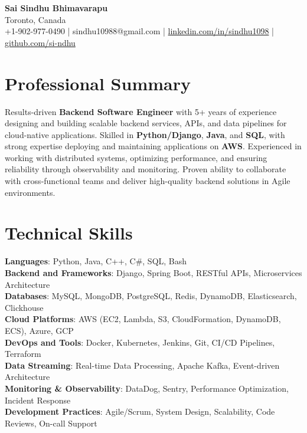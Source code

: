 \documentclass[letterpaper,11pt]{article}
\begin{document}
\begin{center}
  {\Large \textbf{Sai Sindhu Bhimavarapu}} \\
  Toronto, Canada \\
  +1-902-977-0490 \enspace | \enspace sindhu10988@gmail.com \enspace | \enspace \href{https://www.linkedin.com/in/sindhu1098/}{linkedin.com/in/sindhu1098} \enspace | \enspace \href{https://github.com/si-ndhu}{github.com/si-ndhu}
\end{center}

\section{Professional Summary}
  \begin{itemize}[leftmargin=0.15in, label={}]
    \small{\item{
     Results-driven \textbf{Backend Software Engineer} with 5+ years of experience designing and building scalable backend services, APIs, and data pipelines for cloud-native applications. Skilled in \textbf{Python/Django}, \textbf{Java}, and \textbf{SQL}, with strong expertise deploying and maintaining applications on \textbf{AWS}. Experienced in working with distributed systems, optimizing performance, and ensuring reliability through observability and monitoring. Proven ability to collaborate with cross-functional teams and deliver high-quality backend solutions in Agile environments.
    }}
  \end{itemize}
\vspace{-16pt}

\section{Technical Skills}
 \begin{itemize}[leftmargin=0.15in, label={}]
    \small{\item{
     \textbf{Languages}: Python, Java, C++, C\#, SQL, Bash \\
     \textbf{Backend and Frameworks}: Django, Spring Boot, RESTful APIs, Microservices Architecture \\
     \textbf{Databases}: MySQL, MongoDB, PostgreSQL, Redis, DynamoDB, Elasticsearch, Clickhouse \\
     \textbf{Cloud Platforms}: AWS (EC2, Lambda, S3, CloudFormation, DynamoDB, ECS), Azure, GCP \\
     \textbf{DevOps and Tools}: Docker, Kubernetes, Jenkins, Git, CI/CD Pipelines, Terraform \\
     \textbf{Data Streaming}: Real-time Data Processing, Apache Kafka, Event-driven Architecture \\
     \textbf{Monitoring \& Observability}: DataDog, Sentry, Performance Optimization, Incident Response \\
     \textbf{Development Practices}: Agile/Scrum, System Design, Scalability, Code Reviews, On-call Support
    }}
 \end{itemize}
\vspace{-16pt}
\end{document}

